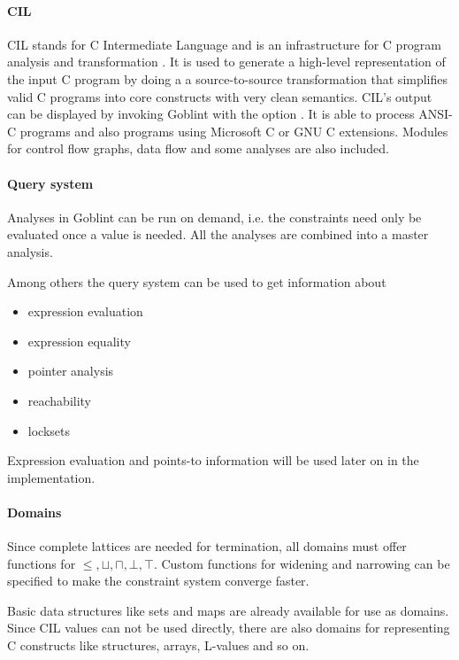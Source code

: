 \paragraph*{CIL}
CIL stands for C Intermediate Language and is an infrastructure for C program analysis and transformation \cite{Necula:2002:CIL:647478.727796}. It is used to generate a high-level representation of the input C program by doing a a source-to-source transformation that simplifies valid C programs into core constructs with very clean semantics. CIL's output can be displayed by invoking Goblint with the option . It is able to process ANSI-C programs and also programs using Microsoft C or GNU C extensions. Modules for control flow graphs, data flow and some analyses are also included.

\paragraph*{Query system}
Analyses in Goblint can be run on demand, i.e. the constraints need only be evaluated once a value is needed. All the analyses are combined into a master analysis.

Among others the query system can be used to get information about
\begin{itemize}
\item expression evaluation
\item expression equality
\item pointer analysis
\item reachability
\item locksets
\end{itemize}
Expression evaluation and points-to information will be used later on in the implementation.

\paragraph*{Domains}
Since complete lattices are needed for termination, all domains must offer functions for $\leq, \sqcup, \sqcap, \bot, \top$. Custom functions for widening and narrowing can be specified to make the constraint system converge faster.

Basic data structures like sets and maps are already available for use as domains. Since CIL values can not be used directly, there are also domains for representing C constructs like structures, arrays, L-values and so on.


